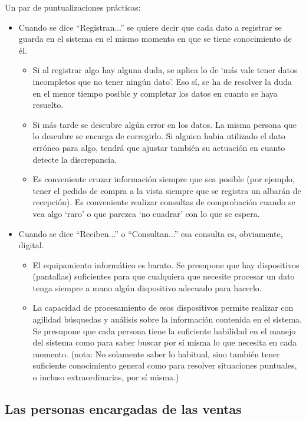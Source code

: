 \documentclass[spanish,12pt,a4paper,final,oneside]{book}
\begin{document}
Un par de puntualizaciones prácticas:
\begin{itemize}

\item Cuando se dice ``Registran...'' se quiere decir que cada dato a registrar se guarda en el sistema en el mismo momento en que se tiene conocimiento de él. 
\begin{itemize}
\item Si al registrar algo hay alguna duda, se aplica lo de ‘más vale tener datos incompletos que no tener ningún dato’. Eso sí, se ha de resolver la duda en el menor tiempo posible y completar los datos en cuanto se haya resuelto.
\item Si más tarde se descubre algún error en los datos. La misma persona que lo descubre se encarga de corregirlo. Si alguien habia utilizado el dato erróneo para algo, tendrá que ajustar también su actuación en cuanto detecte la discrepancia. 
\item Es conveniente cruzar información siempre que sea posible (por ejemplo, tener el pedido de compra a la vista siempre que se registra un albarán de recepción). Es conveniente realizar consultas de comprobación cuando se vea algo ‘raro’ o que parezca ‘no cuadrar’ con lo que se espera. 
\end{itemize}

\item Cuando se dice ``Reciben...'' o ``Consultan...'' esa consulta es, obviamente, digital. 
\begin{itemize}
\item El equipamiento informático es barato. Se presupone que hay dispositivos (pantallas) suficientes para que cualquiera que necesite procesar un dato tenga siempre a mano algún dispositivo adecuado para hacerlo.
\item La capacidad de procesamiento de esos dispositivos permite realizar con agilidad búsquedas y análisis sobre la información contenida en el sistema. Se presupone que cada persona tiene la suficiente habilidad en el manejo del sistema como para saber buscar por sí misma lo que necesita en cada momento. (nota: No solamente saber lo habitual, sino también tener suficiente conocimiento general como para resolver situaciones puntuales, o incluso extraordinarias, por sí misma.)
\end{itemize}

\end{itemize}


\subsection{Las personas encargadas de las ventas}
\end{document}
